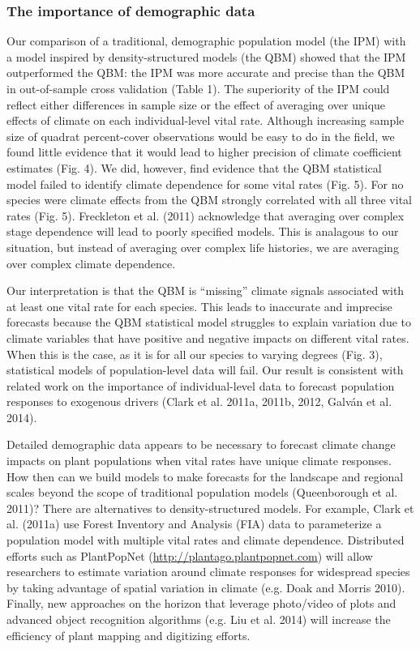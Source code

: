 \documentclass[12pt,]{article}
\begin{document}
\subsubsection{The importance of demographic
data}\label{the-importance-of-demographic-data}

Our comparison of a traditional, demographic population model (the IPM)
with a model inspired by density-structured models (the QBM) showed that
the IPM outperformed the QBM: the IPM was more accurate and precise than
the QBM in out-of-sample cross validation (Table 1). The superiority of
the IPM could reflect either differences in sample size or the effect of
averaging over unique effects of climate on each individual-level vital
rate. Although increasing sample size of quadrat percent-cover
observations would be easy to do in the field, we found little evidence
that it would lead to higher precision of climate coefficient estimates
(Fig. 4). We did, however, find evidence that the QBM statistical model
failed to identify climate dependence for some vital rates (Fig. 5). For
no species were climate effects from the QBM strongly correlated with
all three vital rates (Fig. 5). Freckleton et al. (2011) acknowledge
that averaging over complex stage dependence will lead to poorly
specified models. This is analagous to our situation, but instead of
averaging over complex life histories, we are averaging over complex
climate dependence.

Our interpretation is that the QBM is ``missing'' climate signals
associated with at least one vital rate for each species. This leads to
inaccurate and imprecise forecasts because the QBM statistical model
struggles to explain variation due to climate variables that have
positive and negative impacts on different vital rates. When this is the
case, as it is for all our species to varying degrees (Fig. 3),
statistical models of population-level data will fail. Our result is
consistent with related work on the importance of individual-level data
to forecast population responses to exogenous drivers (Clark et al.
2011a, 2011b, 2012, Galván et al. 2014).

Detailed demographic data appears to be necessary to forecast climate
change impacts on plant populations when vital rates have unique climate
responses. How then can we build models to make forecasts for the
landscape and regional scales beyond the scope of traditional population
models (Queenborough et al. 2011)? There are alternatives to
density-structured models. For example, Clark et al. (2011a) use Forest
Inventory and Analysis (FIA) data to parameterize a population model
with multiple vital rates and climate dependence. Distributed efforts
such as PlantPopNet (\url{http://plantago.plantpopnet.com}) will allow
researchers to estimate variation around climate responses for
widespread species by taking advantage of spatial variation in climate
(e.g. Doak and Morris 2010). Finally, new approaches on the horizon that
leverage photo/video of plots and advanced object recognition algorithms
(e.g. Liu et al. 2014) will increase the efficiency of plant mapping and
digitizing efforts.
\end{document}
